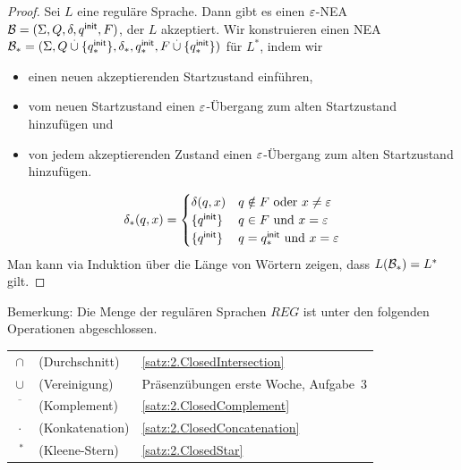 \begin{proof}
Sei $L$ eine reguläre Sprache. Dann gibt es einen $\varepsilon$-NEA $\mathcal{B}=(\Sigma, Q, \delta, q^\mathsf{init}, F)$, der $L$ akzeptiert. 
Wir konstruieren einen NEA $\mathcal{B}_*=(\Sigma, Q\overset.\cup\{q^\mathsf{init}_*\}, \delta_*, q^\mathsf{init}_*, F\overset.\cup\{q^\mathsf{init}_*\})$ für $L^*$, indem wir
\begin{itemize}
 \item einen neuen akzeptierenden Startzustand einführen,
 \item vom neuen Startzustand einen $\varepsilon$-Übergang zum alten Startzustand hinzufügen und
 \item von jedem akzeptierenden Zustand einen $\varepsilon$-Übergang zum alten Startzustand hinzufügen.
\end{itemize}
\[
                \delta_*(q,x) =
                        \begin{cases}
                                \delta(q,x) & q\notin F \text{ oder } x \neq \varepsilon\\
                                \{q^\mathsf{init}\} & q\in F \text{ und } x = \varepsilon \\
                                \{q^\mathsf{init}\} & q=q^\mathsf{init}_* \text{ und } x = \varepsilon
                        \end{cases}
\]
Man kann via Induktion über die Länge von Wörtern zeigen, dass $L(\mathcal{B}_*)=L^*$ gilt.
\end{proof}

Bemerkung: Die Menge der regulären Sprachen $REG$ ist unter den folgenden Operationen abgeschlossen.

\begin{center}
\begin{tabular}{cl@{\quad}l}
 $\cap$ & (Durchschnitt) & \autoref{satz:2.ClosedIntersection}\\
 $\cup$ & (Vereinigung) & Präsenzübungen erste Woche, Aufgabe~3\\
 $\overline{\phantom{X}}$ & (Komplement) & \autoref{satz:2.ClosedComplement}\\
 $\cdot$ & (Konkatenation) & \autoref{satz:2.ClosedConcatenation}\\
 $\phantom{\cdot}^*$ & (Kleene-Stern) & \autoref{satz:2.ClosedStar} 
\end{tabular}
\end{center}



